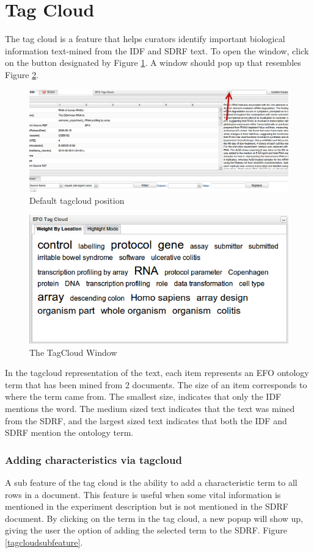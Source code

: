 \documentclass[a4paper]{article}
\begin{document}
\section{Tag Cloud}
The tag cloud is a feature that helps curators identify important biological information text-mined from the IDF and SDRF text. To open the window, click on the button designated by Figure \ref{tagcloudopen}. A window should pop up that resembles Figure \ref{tagcloud}. 

\begin{figure}[h]
\caption{Default tagcloud position}
\centering
\label{tagcloudopen}
\includegraphics[width=17cm]{images/tagcloudopen}
\end{figure}

\begin{figure}[h]
\caption{The TagCloud Window}
\centering
\label{tagcloud}
\includegraphics[width=12cm]{images/tagcloud}
\end{figure}

In the tagcloud representation of the text, each item represents an EFO ontology term that has been mined from 2 documents. The size of an item corresponds to where the term came from. The smallest size, indicates that only the IDF mentions the word. The medium sized text indicates that the text was mined from the SDRF, and the largest sized text indicates that both the IDF and SDRF mention the ontology term. 

\subsubsection*{Adding characteristics via tagcloud}
A sub feature of the tag cloud is the ability to add a characteristic term to all rows in a document. This feature is useful when some vital information is mentioned in the experiment description but is not mentioned in the SDRF document. By clicking on the term in the tag cloud, a new popup will show up, giving the user the option of adding the selected term to the SDRF. Figure \ref{tagcloudsubfeature}.
\end{document}
